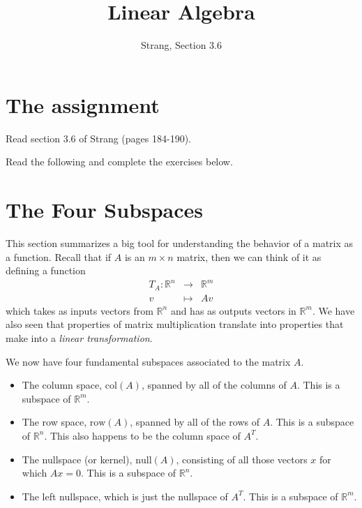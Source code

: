 \documentclass[11pt]{amsart}
\theoremstyle{definition}
\begin{document}
\title{Linear Algebra}
\author{Strang, Section 3.6}
\maketitle

\section{The assignment}
\begin{compactitem}
\item Read section 3.6 of Strang (pages 184-190).
\item Read the following and complete the exercises below.
\end{compactitem}


\section{The Four Subspaces}

This section summarizes a big tool for understanding the behavior of a matrix as a function.
Recall that if $A$ is an $m\times n$ matrix, then we can think of it as defining a function
\[
\begin{array}{rcl}
T_A: \mathbb{R}^n & \rightarrow & \mathbb{R}^m \\
v & \mapsto & Av
\end{array}
\]
which takes as inputs vectors from $\mathbb{R}^n$ and has as outputs vectors in $\mathbb{R}^m$. We have also seen that properties of matrix multiplication translate into properties that make into a \emph{linear transformation}.

We now have four fundamental subspaces associated to the matrix $A$.
\begin{itemize}
\item The column space, $\mathrm{col}(A)$, spanned by all of the columns of $A$. This is a subspace of $\mathbb{R}^m$.
\item The row space, $\mathrm{row}(A)$, spanned by all of the rows of $A$. This is a subspace of $\mathbb{R}^n$. This also happens to be the column space of $A^T$.
\item The nullspace (or kernel), $\mathrm{null}(A)$, consisting of all those vectors $x$ for which $Ax=0$. This is a subspace of $\mathbb{R}^n$.
\item The left nullspace, which is just the nullspace of $A^T$. This is a subspace of $\mathbb{R}^m$.
\end{itemize}
\end{document}
